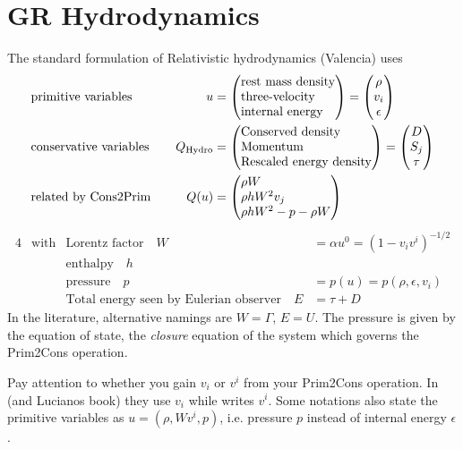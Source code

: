\documentclass[a4paper]{article}
\newcommand{\desc}[1]{\text{#1}\quad}
\newcommand{\hydro}{\text{Hydro}}
\newenvironment{pvector}{\begin{pmatrix*}[l]}{\end{pmatrix*}}
\begin{document}
\section{GR Hydrodynamics}
The standard formulation of Relativistic hydrodynamics (Valencia)
uses
\begin{alignat}{4}
\label{eq.grhd.prim}
&\text{primitive variables}
&
\quad u &=
\begin{pvector}
\text{rest mass density} \\
\text{three-velocity} \\
\text{internal energy}
\end{pvector}
= \begin{pmatrix} \rho \\ v_i \\ \epsilon \end{pmatrix}
\\
\label{eq.grhd.cons}
&
\desc{conservative variables}
&
Q_\hydro
&=
\begin{pvector}
\text{Conserved density} \\
\text{Momentum} \\
\text{Rescaled energy density}
\end{pvector}
=
\begin{pmatrix} D \\ S_j \\ \tau \end{pmatrix}
\\
&
\desc{related by Cons2Prim}
&
Q(u)
&=
\begin{pvector}
\rho W \\
\rho h W^2 v_j \\
\rho h W^2 - p - \rho W
\end{pvector}
\end{alignat}
\begin{alignat}{4}
&\text{with}
&
\desc{Lorentz factor}
W&=\alpha u^0 = (1 - v_i v^i)^{-1/2}
\\
&&
\desc{enthalpy} h &
\\
&&
\desc{pressure} p &= p(u) = p(\rho,\epsilon, v_i)
\\
&&
\desc{Total energy seen by Eulerian observer} E
&= \tau + D
\end{alignat}
In the literature, alternative namings are $W=\Gamma$, $E=U$.
The pressure is given by the equation of state, the \emph{closure}
equation of the system which governs the Prim2Cons operation.

Pay attention to whether you gain $v_i$ or $v^i$ from your Prim2Cons
operation. In \cite{THC} (and Lucianos book) they use $v_i$ while
\cite{BHAC} writes $v^i$. Some notations also state the primitive
variables as $u=(\rho,W v^i, p)$, i.e. pressure $p$ instead of
internal energy $\epsilon$.
\end{document}
